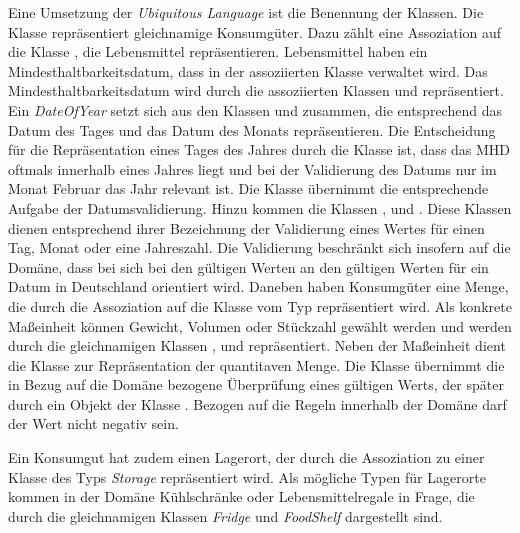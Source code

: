 Eine Umsetzung der \textit{Ubiquitous Language} ist die Benennung der Klassen.
Die Klasse \href{}{} repräsentiert gleichnamige Konsumgüter.
Dazu zählt eine Assoziation auf die Klasse \href{}{}, die Lebensmittel repräsentieren.
Lebensmittel haben ein Mindesthaltbarkeitsdatum, dass in der assoziierten Klasse \href{}{} verwaltet wird.
Das Mindesthaltbarkeitsdatum wird durch die assoziierten Klassen \href{}{} und \href{}{} repräsentiert.
Ein \textit{DateOfYear} setzt sich aus den Klassen \href{}{} und \href{}{} zusammen, die entsprechend das Datum des Tages und das Datum des Monats repräsentieren.
Die Entscheidung für die Repräsentation eines Tages des Jahres durch die Klasse \href{}{} ist, dass das MHD oftmals innerhalb eines Jahres liegt und bei der Validierung des Datums nur im Monat Februar das Jahr relevant ist.
Die Klasse \href{}{} übernimmt die entsprechende Aufgabe der Datumsvalidierung.
Hinzu kommen die Klassen \href{}{}, \href{}{} und \href{}{}.
Diese Klassen dienen entsprechend ihrer Bezeichnung der Validierung eines Wertes für einen Tag, Monat oder eine Jahreszahl.
Die Validierung beschränkt sich insofern auf die Domäne, dass bei sich bei den gültigen Werten an den gültigen Werten für ein Datum in Deutschland orientiert wird.
Daneben haben Konsumgüter eine Menge, die durch die Assoziation auf die Klasse vom Typ \href{}{} repräsentiert wird.
Als konkrete Maßeinheit können Gewicht, Volumen oder Stückzahl gewählt werden und werden durch die gleichnamigen Klassen \href{}{}, \href{}{} und \href{}{} repräsentiert.
Neben der Maßeinheit dient die Klasse \href{}{} zur Repräsentation der quantitaven Menge.
Die Klasse \href{}{} übernimmt die in Bezug auf die Domäne bezogene Überprüfung eines gültigen Werts, der später durch ein Objekt der Klasse \href{}{}.
Bezogen auf die Regeln innerhalb der Domäne darf der Wert nicht negativ sein.

Ein Konsumgut hat zudem einen Lagerort, der durch die Assoziation zu einer Klasse des Typs \textit{Storage} repräsentiert wird.
Als mögliche Typen für Lagerorte kommen in der Domäne Kühlschränke oder Lebensmittelregale in Frage, die durch die gleichnamigen Klassen \textit{Fridge} und \textit{FoodShelf} dargestellt sind.

